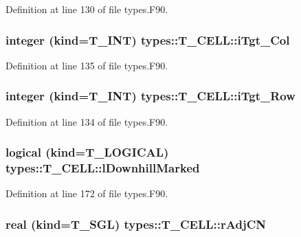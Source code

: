 Definition at line 130 of file types.F90.

\hypertarget{typetypes_1_1_t___c_e_l_l_ae505e6b7b939a3f96079a70c73cab67a}{
\subsubsection[{iTgt\_\-Col}]{\setlength{\rightskip}{0pt plus 5cm}integer (kind={\bf T\_\-INT}) {\bf types::T\_\-CELL::iTgt\_\-Col}}}
\label{typetypes_1_1_t___c_e_l_l_ae505e6b7b939a3f96079a70c73cab67a}


Definition at line 135 of file types.F90.

\hypertarget{typetypes_1_1_t___c_e_l_l_aa4f32ace62145583810423f97cae581b}{
\subsubsection[{iTgt\_\-Row}]{\setlength{\rightskip}{0pt plus 5cm}integer (kind={\bf T\_\-INT}) {\bf types::T\_\-CELL::iTgt\_\-Row}}}
\label{typetypes_1_1_t___c_e_l_l_aa4f32ace62145583810423f97cae581b}


Definition at line 134 of file types.F90.

\hypertarget{typetypes_1_1_t___c_e_l_l_aff95e831b6e34dbd3063ed1ef0acbf20}{
\subsubsection[{lDownhillMarked}]{\setlength{\rightskip}{0pt plus 5cm}logical (kind={\bf T\_\-LOGICAL}) {\bf types::T\_\-CELL::lDownhillMarked}}}
\label{typetypes_1_1_t___c_e_l_l_aff95e831b6e34dbd3063ed1ef0acbf20}


Definition at line 172 of file types.F90.

\hypertarget{typetypes_1_1_t___c_e_l_l_a8d7ee5136c4c7c6a767beb0c3784e2df}{
\subsubsection[{rAdjCN}]{\setlength{\rightskip}{0pt plus 5cm}real (kind={\bf T\_\-SGL}) {\bf types::T\_\-CELL::rAdjCN}}}
\label{typetypes_1_1_t___c_e_l_l_a8d7ee5136c4c7c6a767beb0c3784e2df}


